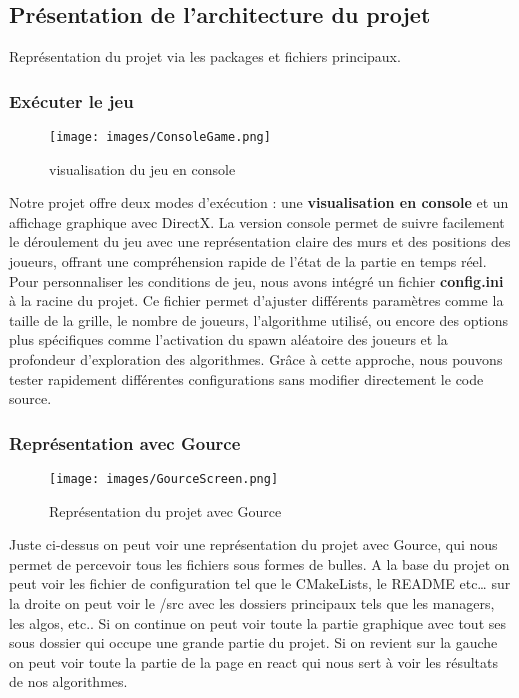 \subsection{Présentation de l'architecture du projet}
Représentation du projet via les packages et fichiers principaux.

\subsubsection{Exécuter le jeu}
\begin{figure}[h]
	\centering
	\texttt{[image: images/ConsoleGame.png]}
	\caption{visualisation du jeu en console}
	\label{ConsoleGame}
\end{figure}
Notre projet offre deux modes d'exécution : une \textbf{visualisation en console} et un affichage graphique avec DirectX. La version console permet de suivre facilement le déroulement du jeu avec une représentation claire des murs et des positions des joueurs, offrant une compréhension rapide de l’état de la partie en temps réel. \\
Pour personnaliser les conditions de jeu, nous avons intégré un fichier \textbf{config.ini} à la racine du projet. Ce fichier permet d'ajuster différents paramètres comme la taille de la grille, le nombre de joueurs, l’algorithme utilisé, ou encore des options plus spécifiques comme l’activation du spawn aléatoire des joueurs et la profondeur d’exploration des algorithmes. Grâce à cette approche, nous pouvons tester rapidement différentes configurations sans modifier directement le code source.

\subsubsection{Représentation avec Gource}
\begin{figure}[h]
	\centering
	\texttt{[image: images/GourceScreen.png]}
	\caption{Représentation du projet avec Gource}
	\label{GourceScreen}
\end{figure}
Juste ci-dessus on peut voir une représentation du projet avec Gource, qui nous permet de percevoir tous les fichiers sous formes de bulles. A la base du projet on peut voir les fichier de configuration tel que le CMakeLists, le README etc… sur la droite on peut voir le /src avec les dossiers principaux tels que les managers, les algos, etc.. Si on continue on peut voir toute la partie graphique avec tout ses sous dossier qui occupe une grande partie du projet. Si on revient sur la gauche on peut voir toute la partie de la page en react qui nous sert à voir les résultats de nos algorithmes.

